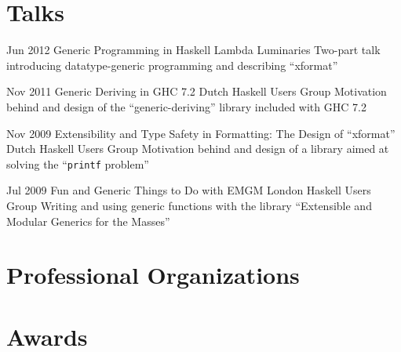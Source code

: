 \documentclass[11pt,a4paper,roman]{moderncv}
\begin{document}



\nocite{*}




\section{Talks}

\cventry%
{Jun 2012}%
{Generic Programming in Haskell}%
{Lambda Luminaries}%
{\centurion}%
{}%
{Two-part talk introducing datatype-generic programming and describing ``xformat''}

\cventry%
{Nov 2011}%
{Generic Deriving in GHC 7.2}%
{Dutch Haskell Users Group}%
{\utrecht}%
{}%
{Motivation behind and design of the ``generic-deriving'' library included with GHC 7.2}

\cventry%
{Nov 2009}%
{Extensibility and Type Safety in Formatting: The Design of ``xformat''}%
{Dutch Haskell Users Group}%
{\utrecht}%
{}%
{Motivation behind and design of a library aimed at solving the ``\texttt{printf} problem''}

\cventry%
{Jul 2009}%
{Fun and Generic Things to Do with EMGM}%
{London Haskell Users Group}%
{\london}%
{}%
{Writing and using generic functions with the library ``Extensible and Modular Generics for the Masses''}


\section{Professional Organizations}




\section{Awards}

\end{document}
